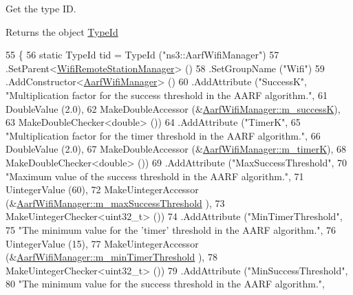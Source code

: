 Get the type ID. 

\begin{DoxyReturn}{Returns}
the object \hyperlink{classns3_1_1TypeId}{Type\+Id} 
\end{DoxyReturn}

\begin{DoxyCode}
55 \{
56   \textcolor{keyword}{static} TypeId tid = TypeId (\textcolor{stringliteral}{"ns3::AarfWifiManager"})
57     .SetParent<\hyperlink{classns3_1_1WifiRemoteStationManager_a78524840f5900e1937e8e2d6df48954d}{WifiRemoteStationManager}> ()
58     .SetGroupName (\textcolor{stringliteral}{"Wifi"})
59     .AddConstructor<\hyperlink{classns3_1_1AarfWifiManager_acbc4c0951d544f273a1180e757962189}{AarfWifiManager}> ()
60     .AddAttribute (\textcolor{stringliteral}{"SuccessK"}, \textcolor{stringliteral}{"Multiplication factor for the success threshold in the AARF algorithm."},
61                    DoubleValue (2.0),
62                    MakeDoubleAccessor (&\hyperlink{classns3_1_1AarfWifiManager_a37e881b1ae22c8c7fd4fca36e027117a}{AarfWifiManager::m\_successK}),
63                    MakeDoubleChecker<double> ())
64     .AddAttribute (\textcolor{stringliteral}{"TimerK"},
65                    \textcolor{stringliteral}{"Multiplication factor for the timer threshold in the AARF algorithm."},
66                    DoubleValue (2.0),
67                    MakeDoubleAccessor (&\hyperlink{classns3_1_1AarfWifiManager_a3d4f7898576f87f739dd0f3746387bd1}{AarfWifiManager::m\_timerK}),
68                    MakeDoubleChecker<double> ())
69     .AddAttribute (\textcolor{stringliteral}{"MaxSuccessThreshold"},
70                    \textcolor{stringliteral}{"Maximum value of the success threshold in the AARF algorithm."},
71                    UintegerValue (60),
72                    MakeUintegerAccessor (&\hyperlink{classns3_1_1AarfWifiManager_a66100481b6ec3a506ef0fbea3de7cb7d}{AarfWifiManager::m\_maxSuccessThreshold}
      ),
73                    MakeUintegerChecker<uint32\_t> ())
74     .AddAttribute (\textcolor{stringliteral}{"MinTimerThreshold"},
75                    \textcolor{stringliteral}{"The minimum value for the 'timer' threshold in the AARF algorithm."},
76                    UintegerValue (15),
77                    MakeUintegerAccessor (&\hyperlink{classns3_1_1AarfWifiManager_a87cd21fd98cc5330f70cb3960f5acca4}{AarfWifiManager::m\_minTimerThreshold}
      ),
78                    MakeUintegerChecker<uint32\_t> ())
79     .AddAttribute (\textcolor{stringliteral}{"MinSuccessThreshold"},
80                    \textcolor{stringliteral}{"The minimum value for the success threshold in the AARF algorithm."},

\end{DoxyCode}
